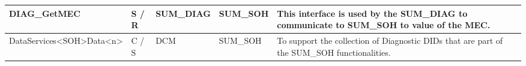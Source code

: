 \begin{longtable}{|l|l|l|l|l|}
\begin{minipage}{0.39\linewidth}\raggedright\vspace{.75ex}DIAG\_GetMEC\vspace{.75ex}\end{minipage} & \begin{minipage}{0.07\linewidth}\raggedright\vspace{.75ex}S / R\vspace{.75ex}\end{minipage} & \begin{minipage}{0.11\linewidth}\raggedright\vspace{.75ex}SUM\_DIAG\vspace{.75ex}\end{minipage} & \begin{minipage}{0.11\linewidth}\raggedright\vspace{.75ex}SUM\_SOH\vspace{.75ex}\end{minipage} & \begin{minipage}{0.16\linewidth}\raggedright\vspace{.75ex}This interface is used by the SUM\_DIAG to communicate to SUM\_SOH to value of the MEC.\vspace{.75ex}\end{minipage}\\\hline
\begin{minipage}{0.39\linewidth}\raggedright\vspace{.75ex}DataServices<SOH>Data<n>\vspace{.75ex}\end{minipage} & \begin{minipage}{0.07\linewidth}\raggedright\vspace{.75ex}C / S\vspace{.75ex}\end{minipage} & \begin{minipage}{0.11\linewidth}\raggedright\vspace{.75ex}DCM\vspace{.75ex}\end{minipage} & \begin{minipage}{0.11\linewidth}\raggedright\vspace{.75ex}SUM\_SOH\vspace{.75ex}\end{minipage} & \begin{minipage}{0.16\linewidth}\raggedright\vspace{.75ex}To support the collection of Diagnostic DIDs that are part of the SUM\_SOH functionalities.\vspace{.75ex}\end{minipage}\\\hline

\end{longtable}
